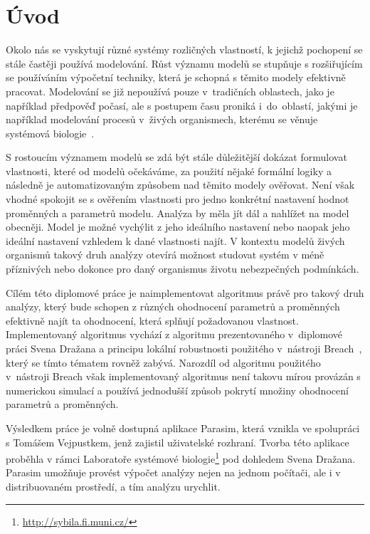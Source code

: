 \chapter{Úvod}\label{chapter:introduction}

Okolo nás se vyskytují různé systémy rozličných vlastností, k jejichž
pochopení se stále častěji používá modelování. Růst významu modelů se stupňuje
s rozšiřujícím se používáním výpočetní techniky, která je schopná s těmito modely
efektivně pracovat. Modelování se již nepoužívá pouze v~tradičních oblastech, jako je například
předpověď počasí, ale s postupem času proniká i~do~oblastí, jakými je například
modelování procesů v~živých organismech, kte\-ré\-mu se věnuje systémová biologie~\cite{westerhoff2005}.

S rostoucím významem modelů se zdá být stále důležitější dokázat formulovat
vlastnosti, které od modelů očekáváme, za použití nějaké for\-mál\-ní logiky a následně
je automatizovaným způsobem nad těmito modely o\-vě\-řo\-vat. Není však vhodné spokojit se s ověřením
vlastnosti pro jedno konkrétní nastavení hodnot proměnných a parametrů modelu. Analýza
by měla jít dál a nahlížet na model obecněji. Model je možné vychýlit z jeho ideálního
nastavení nebo naopak jeho ideální nastavení vzhledem k dané vlastnosti najít. V kontextu
modelů živých organismů takový druh analýzy otevírá možnost studovat systém v méně příznivých
nebo dokonce pro daný organismus životu nebezpečných podmínkách.

Cílém této diplomové práce je naimplementovat algoritmus právě pro takový druh analýzy,
který bude schopen z různých ohodnocení parametrů a proměnných efektivně najít ta ohodnocení,
která splňují požadovanou vlastnost. Implementovaný algoritmus vychází z algoritmu
prezentova\-né\-ho v~di\-plo\-mo\-vé práci Svena Dražana \cite{drazan2011} a principu lokální robustnosti použitého v~ná\-stro\-ji Breach~\cite{donze2010breach},
který se tímto té\-ma\-tem rovněž zabývá. Narozdíl od algoritmu pou\-ži\-té\-ho v~ná\-stro\-ji Breach však
implementovaný algoritmus není takovu mírou pro\-vá\-zán s numerickou simulací a používá
jednodušší způ\-sob pokrytí množiny ohodnocení parametrů a proměnných.

Výsledkem práce je volně dostupná aplikace Parasim, která vznikla ve spolupráci s Tomášem Vejpustkem,
jenž zajistil uživatelské rozhraní. Tvor\-ba této aplikace proběhla v rámci Laboratoře
systémové biologie\footnote{\url{http://sybila.fi.muni.cz/}} pod dohledem Svena Dražana.
Parasim umožňuje provést výpočet analýzy nejen na jednom počítači, ale i v distribuovaném
prostředí, a tím analýzu urychlit.

